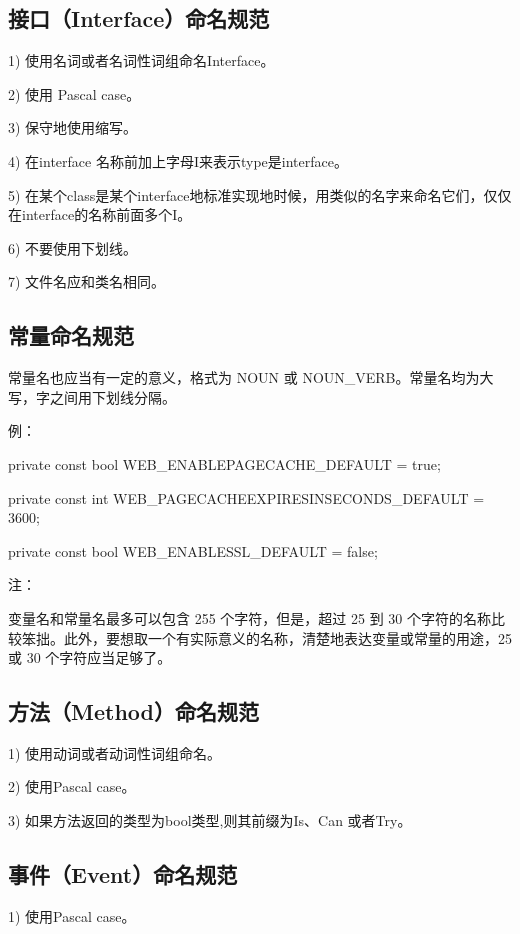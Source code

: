 \documentclass{book}
\begin{document}
\subsection{接口（Interface）命名规范}

1)  使用名词或者名词性词组命名Interface。

2)  使用 Pascal case。

3)  保守地使用缩写。

4)  在interface 名称前加上字母I来表示type是interface。

5)  在某个class是某个interface地标准实现地时候，用类似的名字来命名它们，仅仅在interface的名称前面多个I。

6)  不要使用下划线。

7)  文件名应和类名相同。

\subsection{常量命名规范}

常量名也应当有一定的意义，格式为 NOUN 或 NOUN\_VERB。常量名均为大写，字之间用下划线分隔。

例：

     private const bool   WEB\_ENABLEPAGECACHE\_DEFAULT           = true;

     private const int    WEB\_PAGECACHEEXPIRESINSECONDS\_DEFAULT = 3600;

     private const bool   WEB\_ENABLESSL\_DEFAULT                 = false;

注：

变量名和常量名最多可以包含 255 个字符，但是，超过 25 到 30 个字符的名称比较笨拙。此外，要想取一个有实际意义的名称，清楚地表达变量或常量的用途，25 或 30 个字符应当足够了。

\subsection{方法（Method）命名规范}

1)  使用动词或者动词性词组命名。

2)  使用Pascal case。

3) 如果方法返回的类型为bool类型,则其前缀为Is、Can 或者Try。

\subsection{事件（Event）命名规范}

1)  使用Pascal case。
\end{document}
